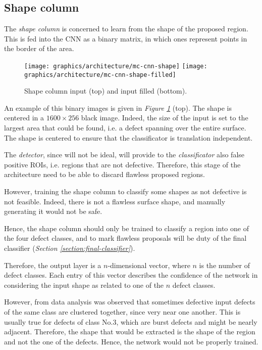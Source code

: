     \subsection{Shape column}\label{section:shape-column}
        \par{
            The \emph{shape column} is concerned to learn from the shape of the proposed region. This is fed into the CNN as a binary matrix, in which ones represent points in the border of the area.
        }
        \begin{figure}
            \centering
            \texttt{[image: graphics/architecture/mc-cnn-shape]}
            \vskip 0.05cm
            \texttt{[image: graphics/architecture/mc-cnn-shape-filled]}
            \caption{Shape column input (top) and input filled (bottom).}\label{fig:mc-cnn:shape-input}
        \end{figure}
        \par{
            An example of this binary images is given in \emph{Figure \ref{fig:mc-cnn:shape-input}} (top). The shape is centered in a $1600\times 256$ black image. Indeed, the size of the input is set to the largest area that could be found, i.e. a defect spanning over the entire surface. The shape is centered to ensure that the classificator is translation independent. 
        }
        \par{
            The \emph{detector}, since will not be ideal, will provide to the \emph{classificator} also false positive ROIs, i.e. regions that are not defective. Therefore, this stage of the architecture need to be able to discard flawless proposed regions.
        }
        \par{
            However, training the shape column to classify some shapes as not defective is not feasible. Indeed, there is not a flawless surface shape, and manually generating it would not be safe.
        }
        \par{
            Hence, the shape column should only be trained to classify a region into one of the four defect classes, and to mark flawless proposals will be duty of the final classifier (\emph{Section \ref{section:final-classifier}}).
        }
        \par{
            Therefore, the output layer is a $n$-dimensional vector, where $n$ is the number of defect classes. Each entry of this vector describes the confidence of the network in considering the input shape as related to one of the $n$ defect classes.
        }
        \par{
            However, from data analysis was observed that sometimes defective input defects of the same class are clustered together, since very near one another. This is usually true for defects of class No.3, which are burst defects and might be nearly adjacent. Therefore, the shape that would be extracted is the shape of the region and not the one of the defects. Hence, the network would not be properly trained.
        }
